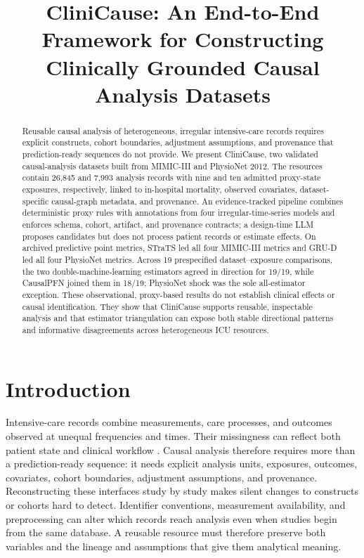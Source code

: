\documentclass[letterpaper]{article}
\title{CliniCause: An End-to-End Framework for Constructing Clinically Grounded Causal Analysis Datasets}
\begin{document}
\maketitle

\begin{abstract}
Reusable causal analysis of heterogeneous, irregular intensive-care records
requires explicit constructs, cohort boundaries, adjustment assumptions, and
provenance that prediction-ready sequences do not provide. We present
CliniCause, two validated causal-analysis datasets built from MIMIC-III and
PhysioNet 2012. The resources contain 26,845 and 7,993 analysis records with
nine and ten admitted proxy-state exposures, respectively, linked to
in-hospital mortality, observed covariates, dataset-specific causal-graph
metadata, and provenance. An evidence-tracked pipeline combines deterministic
proxy rules with annotations from four irregular-time-series models and
enforces schema, cohort, artifact, and provenance contracts; a design-time LLM
proposes candidates but does not process patient records or estimate effects.
On archived predictive point metrics, STraTS led all four MIMIC-III metrics and
GRU-D led all four PhysioNet metrics. Across 19 prespecified dataset--exposure
comparisons, the two double-machine-learning estimators agreed in direction for
19/19, while CausalPFN joined them in 18/19; PhysioNet shock was the sole
all-estimator exception. These observational, proxy-based results do not
establish clinical effects or causal identification. They show that CliniCause
supports reusable, inspectable analysis and that estimator triangulation can
expose both stable directional patterns and informative disagreements across
heterogeneous ICU resources.
\end{abstract}

\section{Introduction}

Intensive-care records combine measurements, care processes, and outcomes
observed at unequal frequencies and times. Their missingness can reflect both
patient state and clinical workflow
\cite{sun_2026_review_irregular_medical_timeseries,
lipton_kale_wetzel_2016_missingness_rnns}. Causal analysis therefore requires
more than a prediction-ready sequence: it needs explicit analysis units,
exposures, outcomes, covariates, cohort boundaries, adjustment assumptions, and
provenance. Reconstructing these interfaces study by study makes silent changes
to constructs or cohorts hard to detect. Identifier conventions, measurement
availability, and preprocessing can alter which records reach analysis even
when studies begin from the same database. A reusable resource must therefore
preserve both variables and the lineage and assumptions that give them
analytical meaning.
\end{document}
